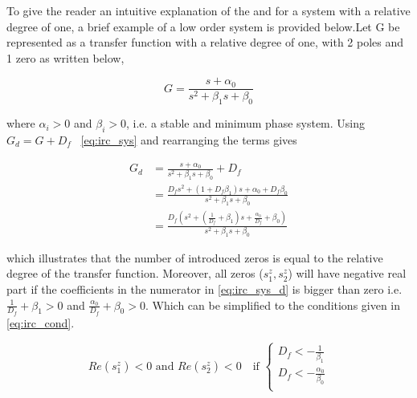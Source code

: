 To give the reader an intuitive explanation of the \abbrIRC and for a system with a relative degree of one, a brief example of a low order system is provided below.Let G be represented as a transfer function with a relative degree of one, with 2 poles and 1 zero as written below,

\begin{equation}
  \label{eq:irc_sys}
  G = \frac{s + \alpha_0}{s^2 + \beta_1s + \beta_0}
\end{equation}

where  $\alpha_i > 0$ and  $\beta_i > 0$, i.e. a stable and minimum phase system.  Using $G_d = G + D_f$  ~\eqref{eq:irc_sys} and rearranging the terms gives

\begin{equation}
  \label{eq:irc_sys_d}
  \begin{split}
  G_d & = \frac{s + \alpha_0}{s^2 + \beta_1s + \beta_0} + D_f \\
      & = \frac{D_fs^2 + (1 + D_f\beta_1)s + \alpha_0 + D_f\beta_0}{s^2 + \beta_1s + \beta_0} \\
      & = \frac{D_f(s^2 + (\frac{1}{D_f} + \beta_1)s + \frac{\alpha_0}{D_f} + \beta_0)}{s^2 + \beta_1s + \beta_0}
  \end{split}
\end{equation}

which illustrates that the number of introduced zeros is equal to the relative degree of the transfer function. Moreover, all zeros ($s^z_1, s^z_2$) will have negative real part if the coefficients in the numerator in \eqref{eq:irc_sys_d} is bigger than zero i.e. $ \frac{1}{D_f} + \beta_1>0$ and $\frac{\alpha_0}{D_f} + \beta_0>0$. Which can be simplified to the conditions given in \eqref{eq:irc_cond}.

\begin{equation}
  \label{eq:irc_cond}
  Re(s^z_1) < 0 \text{ and } Re(s^z_2) < 0 \quad \text{if }
  \begin{cases}
    D_f < -\frac{1}{\beta_1}\\
    D_f < -\frac{\alpha_0}{\beta_0}\\
  \end{cases}
\end{equation}

